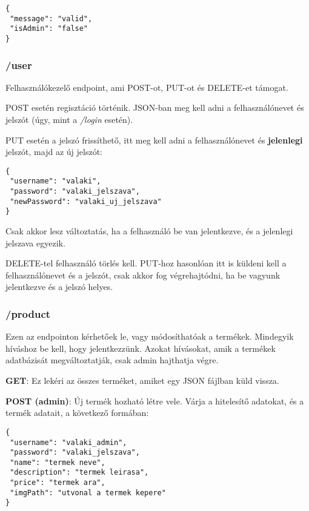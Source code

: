 \documentclass[]{article}
\begin{document}
\bigskip
\begin{lstlisting}
{
 "message": "valid",
 "isAdmin": "false"
}
\end{lstlisting}

\subsubsection{/user}

Felhasználókezelő endpoint, ami POST-ot, PUT-ot és DELETE-et támogat.

POST esetén regisztáció történik. JSON-ban meg kell adni a felhasználónevet és jelszót (úgy, mint a \textit{/login} esetén).

PUT esetén a jelszó frissíthető, itt meg kell adni a felhasználónevet és \textbf{jelenlegi} jelszót, majd az új jelszót:

\bigskip
\begin{lstlisting}
{
 "username": "valaki",
 "password": "valaki_jelszava",
 "newPassword": "valaki_uj_jelszava"
}
\end{lstlisting}

Csak akkor lesz változtatás, ha a felhasználó be van jelentkezve, és a jelenlegi jelszava egyezik.

DELETE-tel felhasználó törlés kell. PUT-hoz hasonlóan itt is küldeni kell a felhasználónevet és a jelszót, csak akkor fog végrehajtódni, ha be vagyunk jelentkezve és a jelszó helyes.

\subsubsection{/product}

Ezen az endpointon kérhetőek le, vagy módosíthatóak a termékek. Mindegyik híváshoz be kell, hogy jelentkezzünk. Azokat hívásokat, amik a termékek adatbázisát megváltoztatják, csak admin hajthatja végre.

\noindent
\textbf{GET}: Ez lekéri az összes terméket, amiket egy JSON fájlban küld vissza.

\noindent
\textbf{POST (admin)}: Új termék hozható létre vele. Várja a hitelesítő adatokat, és a termék adatait, a következő formában:

\bigskip
\begin{lstlisting}
{
 "username": "valaki_admin",
 "password": "valaki_jelszava",
 "name": "termek neve",
 "description": "termek leirasa",
 "price": "termek ara",
 "imgPath": "utvonal a termek kepere"
}
\end{lstlisting}
\end{document}
